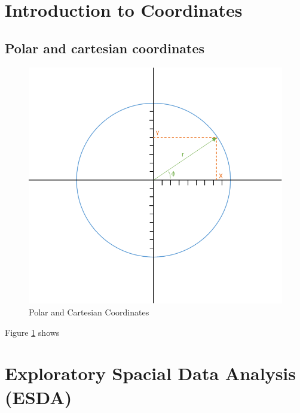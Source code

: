 \documentclass[
]{book}
\theoremstyle{definition}
\theoremstyle{definition}
\theoremstyle{definition}
\theoremstyle{definition}
\theoremstyle{remark}
\begin{document}
\section*{Introduction to Coordinates}\label{introduction-to-coordinates}

\subsection*{Polar and cartesian coordinates}\label{polar-and-cartesian-coordinates}

\begin{figure}

{\centering \includegraphics[width=10.29in]{./images/spacial/coor_pol_car} 

}

\caption{Polar and Cartesian Coordinates}\label{fig:polcar}
\end{figure}

Figure \ref{fig:polcar} shows

\section*{Exploratory Spacial Data Analysis (ESDA)}\label{exploratory-spacial-data-analysis-esda}
\end{document}
